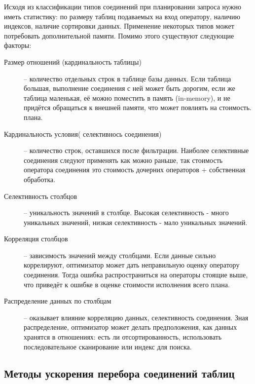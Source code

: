 \documentclass[12pt]{article}
\begin{document}
\begin{flushleft}
Исходя из классификации типов соединений при планировании запроса нужно иметь 
статистику: по размеру таблиц подаваемых на вход оператору, наличию индексов, наличие сортировки данных. 
Применение некоторых типов может потребовать дополнительной памяти.
Помимо этого существуют следующие факторы:
\begin{description}
    \item[Размер отношений (кардинальность таблицы)] -- количество отдельных строк 
    в таблице базы данных. Если таблица большая, выполнение соединения с ней может 
    быть дорогим, если же таблица маленькая, её можно поместить в память (in-memory), 
    и не придётся обращаться к внешней памяти, что может повлиять на стоимость.
    плана.
    \item[Кардинальность условия( селективнось соединения)] -- количество строк, оставшихся после фильтрации. 
    Наиболее селективные соединения следуют применять как можно раньше, так стоимость 
    оператора соединения это стоимость дочерних операторов $+$ собственная обработка.
    \item[Селективность столбцов] -- уникальность значений в столбце. 
    Высокая селективность - много уникальных значений, низкая селективность - мало уникальных значений.
    \item[Корреляция столбцов] -- зависимость значений между столбцами. 
    Если данные сильно коррелируют, оптимизатор может дать неправильную оценку 
    оператору соединения. Тогда ошибка распространиться на операторы стоящие выше,
    что приведёт к ошибке в оценке стоимости исполнения всего плана.
    \item[Распределение данных по столбцам] -- оказывает влияние корреляцию данных, селективность
    соединения. Зная распределение, оптимизатор может делать предположения, как
    данных хранятся в отношениях: есть ли отсортированность, использовать последовательное
    сканирование или индекс для поиска.
\end{description}
\centering \subsection*{Методы ускорения перебора соединений таблиц}
\raggedright


\end{flushleft}
\end{document}
